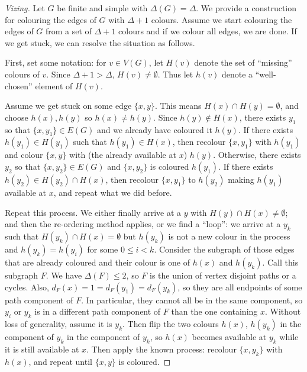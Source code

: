 \documentclass[12pt, a4paper]{book}
\theoremstyle{nonumberplain}
\newtheorem{proof}{Proof}
\begin{document}
\begin{proof}[Vizing]
    Let $G$ be finite and simple with $\Delta(G)=\Delta$.
    We provide a construction for colouring the edges of $G$ with $\Delta+1$ colours.
    Assume we start colouring the edges of $G$ from a set of $\Delta+1$ colours and if we colour all edges, we are done.
    If we get stuck, we can resolve the situation as follows.

    First, set some notation: for $v\in V(G)$, let $H(v)$ denote the set of ``missing'' colours of $v$.
    Since $\Delta+1>\Delta$, $H(v)\neq\emptyset$.
    Thus let $h(v)$ denote a ``well-chosen'' element of $H(v)$.
    \begin{center}
    \end{center}
    Assume we get stuck on some edge $\{x,y\}$.
    This means $H(x)\cap H(y)=\emptyset$, and choose $h(x),h(y)$ so $h(x)\neq h(y)$.
    Since $h(y)\notin H(x)$, there exists $y_1$ so that $\{x,y_1\}\in E(G)$ and we already have coloured it $h(y)$.
    If there exists $h(y_1)\in H(y_1)$ such that $h(y_1)\in H(x)$, then recolour $\{x,y_1\}$ with $h(y_1)$ and colour $\{x,y\}$ with (the already available at $x$) $h(y)$.
    Otherwise, there exists $y_2$ so that $\{x,y_2\}\in E(G)$ and $\{x,y_2\}$ is coloured $h(y_1)$.
    If there exists $h(y_2)\in H(y_2)\cap H(x)$, then recolour $\{x,y_1\}$ to $h(y_2)$ making $h(y_1)$ available at $x$, and repeat what we did before.

    Repeat this process.
    We either finally arrive at a $y$ with $H(y)\cap H(x)\neq\emptyset$; and then the re-ordering method applies, or we find a ``loop'': we arrive at a $y_k$ such that $H(y_k)\cap H(x)=\emptyset$ but $h(y_k)$ is not a new colour in the process and $h(y_k)=h(y_i)$ for some $0\leq i<k$.
    Consider the subgraph of those edges that are already coloured and their colour is one of $h(x)$ and $h(y_k)$.
    Call this subgraph $F$.
    We have $\Delta(F)\leq 2$, so $F$ is the union of vertex disjoint paths or a cycles.
    Also, $d_F(x)=1=d_F(y_1)=d_F(y_k)$, so they are all endpoints of some path component of $F$.
    In particular, they cannot all be in the same component, so $y_i$ or $y_k$ is in a different path component of $F$ than the one containing $x$.
    Without loss of generality, assume it is $y_k$.
    Then flip the two colours $h(x)$, $h(y_k)$ in the component of $y_k$ in the component of $y_k$, so $h(x)$ becomes available at $y_k$ while it is still available at $x$.
    Then apply the known process: recolour $\{x,y_k\}$ with $h(x)$, and repeat until $\{x,y\}$ is coloured.
\end{proof}
\end{document}

